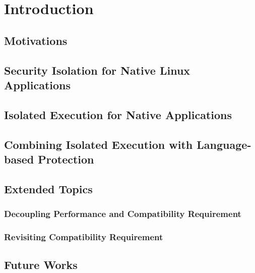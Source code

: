 \chapter{Introduction}

\section{Motivations}

\section{Security Isolation for Native Linux Applications}

\section{Isolated Execution for Native Applications}

\section{Combining Isolated Execution with Language-based Protection}

\section{Extended Topics}

\subsection{Decoupling Performance and Compatibility Requirement}

\subsection{Revisiting Compatibility Requirement}

\section{Future Works}